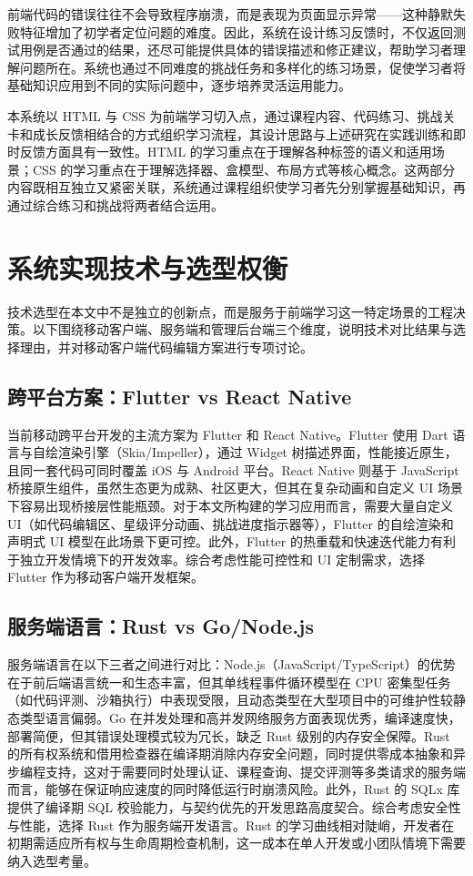 前端代码的错误往往不会导致程序崩溃，而是表现为页面显示异常——这种静默失败特征增加了初学者定位问题的难度。因此，系统在设计练习反馈时，不仅返回测试用例是否通过的结果，还尽可能提供具体的错误描述和修正建议，帮助学习者理解问题所在。系统也通过不同难度的挑战任务和多样化的练习场景，促使学习者将基础知识应用到不同的实际问题中，逐步培养灵活运用能力。

本系统以 HTML 与 CSS 为前端学习切入点，通过课程内容、代码练习、挑战关卡和成长反馈相结合的方式组织学习流程，其设计思路与上述研究在实践训练和即时反馈方面具有一致性。HTML 的学习重点在于理解各种标签的语义和适用场景；CSS 的学习重点在于理解选择器、盒模型、布局方式等核心概念。这两部分内容既相互独立又紧密关联，系统通过课程组织使学习者先分别掌握基础知识，再通过综合练习和挑战将两者结合运用。

\section{系统实现技术与选型权衡}

技术选型在本文中不是独立的创新点，而是服务于前端学习这一特定场景的工程决策。以下围绕移动客户端、服务端和管理后台端三个维度，说明技术对比结果与选择理由，并对移动客户端代码编辑方案进行专项讨论。

\subsection{跨平台方案：Flutter vs React Native}

当前移动跨平台开发的主流方案为 Flutter 和 React Native。Flutter 使用 Dart 语言与自绘渲染引擎（Skia/Impeller），通过 Widget 树描述界面，性能接近原生，且同一套代码可同时覆盖 iOS 与 Android 平台。React Native 则基于 JavaScript 桥接原生组件，虽然生态更为成熟、社区更大，但其在复杂动画和自定义 UI 场景下容易出现桥接层性能瓶颈。对于本文所构建的学习应用而言，需要大量自定义 UI（如代码编辑区、星级评分动画、挑战进度指示器等），Flutter 的自绘渲染和声明式 UI 模型在此场景下更可控。此外，Flutter 的热重载和快速迭代能力有利于独立开发情境下的开发效率。综合考虑性能可控性和 UI 定制需求，选择 Flutter 作为移动客户端开发框架。

\subsection{服务端语言：Rust vs Go/Node.js}

服务端语言在以下三者之间进行对比：Node.js（JavaScript/TypeScript）的优势在于前后端语言统一和生态丰富，但其单线程事件循环模型在 CPU 密集型任务（如代码评测、沙箱执行）中表现受限，且动态类型在大型项目中的可维护性较静态类型语言偏弱。Go 在并发处理和高并发网络服务方面表现优秀，编译速度快，部署简便，但其错误处理模式较为冗长，缺乏 Rust 级别的内存安全保障。Rust 的所有权系统和借用检查器在编译期消除内存安全问题，同时提供零成本抽象和异步编程支持，这对于需要同时处理认证、课程查询、提交评测等多类请求的服务端而言，能够在保证响应速度的同时降低运行时崩溃风险。此外，Rust 的 SQLx 库提供了编译期 SQL 校验能力，与契约优先的开发思路高度契合。综合考虑安全性与性能，选择 Rust 作为服务端开发语言。Rust 的学习曲线相对陡峭，开发者在初期需适应所有权与生命周期检查机制，这一成本在单人开发或小团队情境下需要纳入选型考量。

